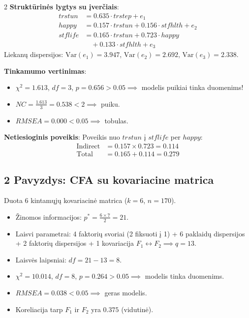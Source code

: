 \documentclass[9pt,a4paper]{article}
\begin{document}
\begin{multicols*}{2}
\textbf{Struktūrinės lygtys su įverčiais}:
\begin{align*}
    trstun &= 0.635 \cdot trstep + e_1 \\
    happy &= 0.157 \cdot trstun + 0.156 \cdot stfhlth + e_2 \\
    stflife &= 0.165 \cdot trstun + 0.723 \cdot happy \\
    &\quad + 0.133 \cdot stfhlth + e_3
\end{align*}
Liekanų dispersijos: $\text{Var}(e_1)=3.947$, $\text{Var}(e_2)=2.692$, $\text{Var}(e_3)=2.338$.

\textbf{Tinkamumo vertinimas}:
\begin{itemize}
    \item $\chi^2 = 1.613$, $df = 3$, $p = 0.656 > 0.05 \implies$ modelis puikiai tinka duomenims!
    \item $NC = \frac{1.613}{3} = 0.538 < 2 \implies$ puiku.
    \item $RMSEA = 0.000 < 0.05 \implies$ tobulas.
\end{itemize}

\textbf{Netiesioginis poveikis}:
Poveikis nuo $trstun$ į $stflife$ per $happy$:
\begin{align*}
    \text{Indirect} &= 0.157 \times 0.723 = 0.114 \\
    \text{Total} &= 0.165 + 0.114 = 0.279
\end{align*}

\subsection{2 Pavyzdys: CFA su kovariacine matrica}
Duota 6 kintamųjų kovariacinė matrica ($k=6$, $n=170$).
\begin{itemize}
    \item Žinomos informacijos: $p^* = \frac{6 \times 7}{2} = 21$.
    \item Laisvi parametrai: 4 faktorių svoriai (2 fiksuoti į 1) + 6 paklaidų dispersijos + 2 faktorių dispersijos + 1 kovariacija $F_1 \leftrightarrow F_2 \implies q = 13$.
    \item Laisvės laipsniai: $df = 21 - 13 = 8$.
    \item $\chi^2 = 10.014$, $df = 8$, $p = 0.264 > 0.05 \implies$ modelis tinka duomenims.
    \item $RMSEA = 0.038 < 0.05 \implies$ geras modelis.
    \item Koreliacija tarp $F_1$ ir $F_2$ yra $0.375$ (vidutinė).
\end{itemize}


\end{multicols*}
\end{document}
